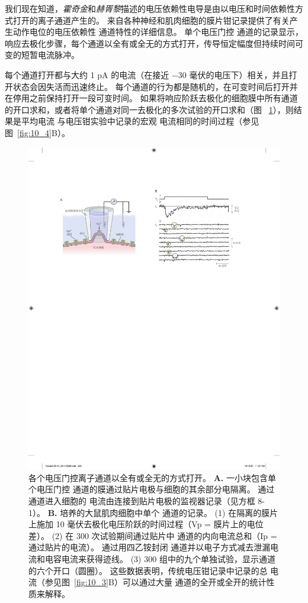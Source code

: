 我们现在知道，\textit{霍奇金}和\textit{赫胥黎}描述的电压依赖性电导是由以电压和时间依赖性方式打开的离子通道产生的。
来自各种神经和肌肉细胞的膜片钳记录提供了有关产生动作电位的电压依赖性  通道特性的详细信息。
单个电压门控  通道的记录显示，响应去极化步骤，每个通道以全有或全无的方式打开，传导恒定幅度但持续时间可变的短暂电流脉冲。


每个通道打开都与大约 1 pA 的电流（在接近 −30 毫伏的电压下）相关，并且打开状态会因失活而迅速终止。 
每个通道的行为都是随机的，在可变时间后打开并在停用之前保持打开一段可变时间。
如果将响应阶跃去极化的细胞膜中所有通道的开口求和，或者将单个通道对同一去极化的多次试验的开口求和（图 ~\ref{fig:10_9}），则结果是平均电流 与电压钳实验中记录的宏观  电流相同的时间过程（参见图~\ref{fig:10_4}B）。


\begin{figure}[htbp]
	\centering
	\includegraphics[width=0.5\linewidth]{chap10/fig_10_9}
	\caption{各个电压门控离子通道以全有或全无的方式打开。
		\textbf{A.} 一小块包含单个电压门控  通道的膜通过贴片电极与细胞的其余部分电隔离。
		通过通道进入细胞的  电流由连接到贴片电极的监视器记录（见方框 8-1）。
		\textbf{B.} 培养的大鼠肌肉细胞中单个  通道的记录。 
		(1) 在隔离的膜片上施加 10 毫伏去极化电压阶跃的时间过程（Vp = 膜片上的电位差）。
		(2) 在 300 次试验期间通过贴片中  通道的内向电流总和（Ip = 通过贴片的电流）。
		通过用四乙铵封闭  通道并以电子方式减去泄漏电流和电容电流来获得迹线。
		(3) 300 组中的九个单独试验，显示通道的六个开口（圆圈）。
		这些数据表明，传统电压钳记录中记录的总  电流（参见图~\ref{fig:10_3}B）可以通过大量  通道的全开或全开的统计性质来解释\cite{sigworth1980single}。}
	\label{fig:10_9}
\end{figure}


